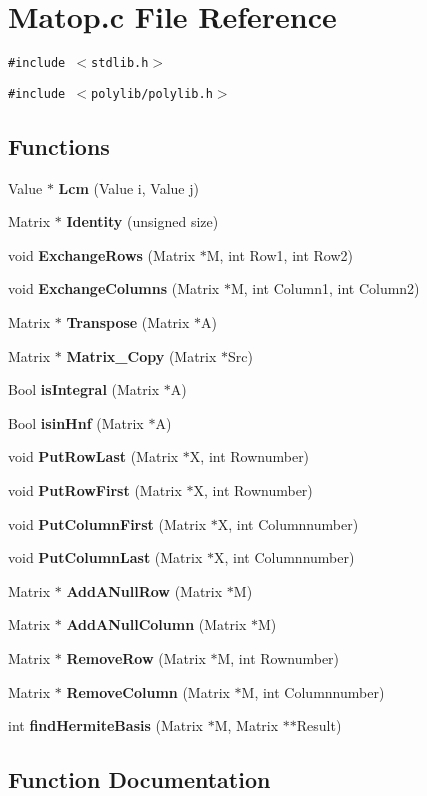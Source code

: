 \section{Matop.c File Reference}
\label{Matop_8c}
{\tt \#include $<$stdlib.h$>$}\par
{\tt \#include $<$polylib/polylib.h$>$}\par
\subsection*{Functions}
\begin{CompactItemize}
\item 
Value $\ast$ {\bf Lcm} (Value i, Value j)
\item 
Matrix $\ast$ {\bf Identity} (unsigned size)
\item 
void {\bf Exchange\-Rows} (Matrix $\ast$M, int Row1, int Row2)
\item 
void {\bf Exchange\-Columns} (Matrix $\ast$M, int Column1, int Column2)
\item 
Matrix $\ast$ {\bf Transpose} (Matrix $\ast$A)
\item 
Matrix $\ast$ {\bf Matrix\_\-Copy} (Matrix $\ast$Src)
\item 
Bool {\bf is\-Integral} (Matrix $\ast$A)
\item 
Bool {\bf isin\-Hnf} (Matrix $\ast$A)
\item 
void {\bf Put\-Row\-Last} (Matrix $\ast$X, int Rownumber)
\item 
void {\bf Put\-Row\-First} (Matrix $\ast$X, int Rownumber)
\item 
void {\bf Put\-Column\-First} (Matrix $\ast$X, int Columnnumber)
\item 
void {\bf Put\-Column\-Last} (Matrix $\ast$X, int Columnnumber)
\item 
Matrix $\ast$ {\bf Add\-ANull\-Row} (Matrix $\ast$M)
\item 
Matrix $\ast$ {\bf Add\-ANull\-Column} (Matrix $\ast$M)
\item 
Matrix $\ast$ {\bf Remove\-Row} (Matrix $\ast$M, int Rownumber)
\item 
Matrix $\ast$ {\bf Remove\-Column} (Matrix $\ast$M, int Columnnumber)
\item 
int {\bf find\-Hermite\-Basis} (Matrix $\ast$M, Matrix $\ast$$\ast$Result)
\end{CompactItemize}


\subsection{Function Documentation}

